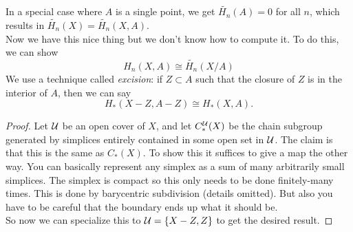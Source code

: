 \documentclass{amsart}
\begin{document}
	 In a special case where $A$ is a single point, we get $\widetilde{H_n}(A)=0$ for all $n$, which results in $\widetilde{H_n}(X)=\widetilde{H_n}(X,A)$.\\
	 
	 Now we have this nice thing but we don't know how to compute it. To do this, we can show 
	 $$
	 H_n(X,A) \cong \widetilde{H_n}(X/A)
	 $$
	 We use a technique called \textit{excision}: if $Z\subset A$ such that the closure of $Z$ is in the interior of $A$, then we can say
	 $$
	 H_*(X-Z,A-Z) \cong H_*(X,A).
	 $$ 
	 \begin{proof}
	 	Let $\mathcal{U}$ be an open cover of $X$, and let $C_*^{\mathcal{U}}(X)$ be the chain subgroup generated by simplices entirely contained in some open set in $\mathcal{U}$. The claim is that this is the same as $C_*(X)$. To show this it suffices to give a map the other way. You can basically represent any simplex as a sum of many arbitrarily small simplices. The simplex is compact so this only needs to be done finitely-many times. This is done by barycentric subdivision (details omitted). But also you have to be careful that the boundary ends up what it should be.\\
	 	
	 	So now we can specialize this to $\mathcal{U}=\{X-Z,Z\}$ to get the desired result.
	 \end{proof}\\
	 
\end{document}
